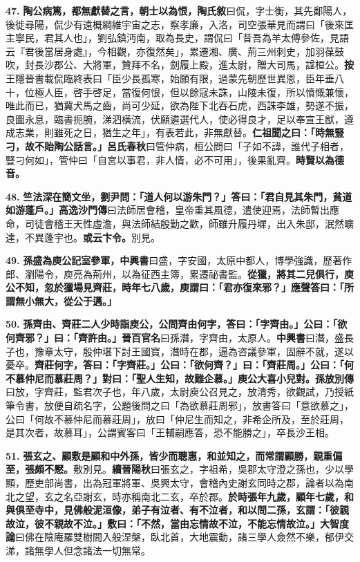 \textbf{47.} \textbf{陶公病篤，都無獻替之言，朝士以為恨，}{\footnotesize \textbf{陶氏敘}曰侃，字士衡，其先鄱陽人，後徙尋陽，侃少有遠概綱維宇宙之志，察孝廉，入洛，司空張華見而謂曰「後來匡主寧民，君其人也」，劉弘鎮沔南，取為長史，謂侃曰「昔吾為羊太傅參佐，見語云『君後當居身處』，今相觀，亦復然矣」，累遷湘、廣、荊三州刺史，加羽葆鼓吹，封長沙郡公、大將軍，贊拜不名，劍履上殿，進太尉，贈大司馬，諡桓公。\textbf{按}王隱晉書載侃臨終表曰「臣少長孤寒，始願有限，過蒙先朝歷世異恩，臣年垂八十，位極人臣，啓手啓足，當復何恨，但以餘寇未誅，山陵未復，所以憤慨兼懷，唯此而已，猶冀犬馬之齒，尚可少延，欲為陛下北吞石虎，西誅李雄，勢遂不振，良圖永息，臨書扼腕，涕泗橫流，伏願遴選代人，使必得良才，足以奉宣王猷，遵成志業，則雖死之日，猶生之年」，有表若此，非無獻替。}\textbf{仁祖聞之曰：「時無豎刁，故不貽陶公話言。」}{\footnotesize \textbf{呂氏春秋}曰管仲病，桓公問曰「子如不諱，誰代子相者，豎刁何如」，管仲曰「自宮以事君，非人情，必不可用」，後果亂齊。}\textbf{時賢以為德音。}

\textbf{48.} \textbf{竺法深在簡文坐，劉尹問：「道人何以游朱門？」答曰：「君自見其朱門，貧道如游蓬戶。」}{\footnotesize \textbf{高逸沙門傳}曰法師居會稽，皇帝重其風德，遣使迎焉，法師暫出應命，司徒會稽王天性虛澹，與法師結殷勤之歡，師雖升履丹墀，出入朱邸，泯然曠達，不異蓬宇也。}\textbf{或云卞令。}{\footnotesize 別見。}

\textbf{49.} \textbf{孫盛為庾公記室參軍，}{\footnotesize \textbf{中興書}曰盛，字安國，太原中都人，博學強識，歷著作郎、瀏陽令，庾亮為荊州，以為征西主簿，累遷祕書監。}\textbf{從獵，將其二兒俱行，庾公不知，忽於獵場見齊莊，時年七八歲，庾謂曰：「君亦復來邪？」應聲答曰：「所謂無小無大，從公于邁。」}

\textbf{50.} \textbf{孫齊由、齊莊二人少時詣庾公，公問齊由何字，答曰：「字齊由。」公曰：「欲何齊邪？」曰：「齊許由。」}{\footnotesize \textbf{晉百官名}曰孫潛，字齊由，太原人。\textbf{中興書}曰潛，盛長子也，豫章太守，殷仲堪下討王國寶，潛時在郡，逼為咨議參軍，固辭不就，遂以憂卒。}\textbf{齊莊何字，答曰：「字齊莊。」公曰：「欲何齊？」曰：「齊莊周。」公曰：「何不慕仲尼而慕莊周？」對曰：「聖人生知，故難企慕。」庾公大喜小兒對。}{\footnotesize \textbf{孫放別傳}曰放，字齊莊，監君次子也，年八歲，太尉庾公召見之，放清秀，欲觀試，乃授紙筆令書，放便自疏名字，公題後問之曰「為欲慕莊周邪」，放書答曰「意欲慕之」，公曰「何故不慕仲尼而慕莊周」，放曰「仲尼生而知之，非希企所及，至於莊周，是其次者，故慕耳」，公謂賓客曰「王輔嗣應答，恐不能勝之」，卒長沙王相。}

\textbf{51.} \textbf{張玄之、顧敷是顧和中外孫，皆少而聰惠，和並知之，而常謂顧勝，親重偏至，張頗不懕。}{\footnotesize 敷別見。\textbf{續晉陽秋}曰張玄之，字祖希，吳郡太守澄之孫也，少以學顯，歷吏部尚書，出為冠軍將軍、吳興太守，會稽內史謝玄同時之郡，論者以為南北之望，玄之名亞謝玄，時亦稱南北二玄，卒於郡。}\textbf{於時張年九歲，顧年七歲，和與俱至寺中，見佛般泥洹像，弟子有泣者、有不泣者，和以問二孫，玄謂：「彼親故泣，彼不親故不泣。」敷曰：「不然，當由忘情故不泣，不能忘情故泣。」}{\footnotesize \textbf{大智度論}曰佛在陰庵羅雙樹間入般涅槃，臥北首，大地震動，諸三學人僉然不樂，郁伊交涕，諸無學人但念諸法一切無常。}

